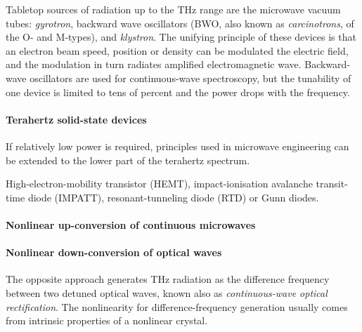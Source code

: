 Tabletop sources of radiation up to the THz range are the microwave vacuum tubes: \textit{gyrotron}, backward wave oscillators (BWO, also known as \textit{carcinotrons}, of the O- and M-types), and \textit{klystron}. The unifying principle of these devices is that an electron beam speed, position or density can be modulated the electric field, and the modulation in turn radiates amplified electromagnetic wave. Backward-wave oscillators are used for continuous-wave spectroscopy, but the tunability of one device is limited to tens of percent and the power drops with the frequency.

\paragraph{Terahertz solid-state devices}
If relatively low power is required, principles used in microwave engineering can be extended to the lower part of the terahertz spectrum. 

High-electron-mobility transistor (HEMT), impact-ionisation avalanche transit-time diode (IMPATT), resonant-tunneling diode (RTD)
\cite{brown1991oscillations}
 or Gunn diodes.



\paragraph{Nonlinear up-conversion of continuous microwaves}

\paragraph{Nonlinear down-conversion of optical waves}
The opposite approach generates THz radiation as the difference frequency between two detuned optical waves, known also as \textit{continuous-wave optical rectification}. The nonlinearity for difference-frequency generation usually comes from intrinsic properties of a nonlinear crystal. 

